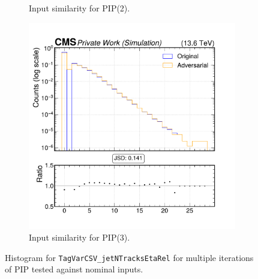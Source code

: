 \begin{figure}[h]
\begin{subfigure}[t]{0.32\textwidth}
    \caption{Input similarity for PIP(2).}
  \end{subfigure}\hfill
  \begin{subfigure}[t]{0.32\textwidth}
    \includegraphics[width=\linewidth]{media/output/features/compare/intprob_3/cmp_global_features_TagVarCSV_jetNTracksEtaRel.pdf}
    \caption{Input similarity for PIP(3).}
  \end{subfigure}

  \caption{Histogram for \texttt{TagVarCSV\_jetNTracksEtaRel} for multiple iterations of PIP tested against nominal inputs.}
  \label{fig:intprob_input_TagVarCSV_jetNTracksEtaRel}
\end{figure}
